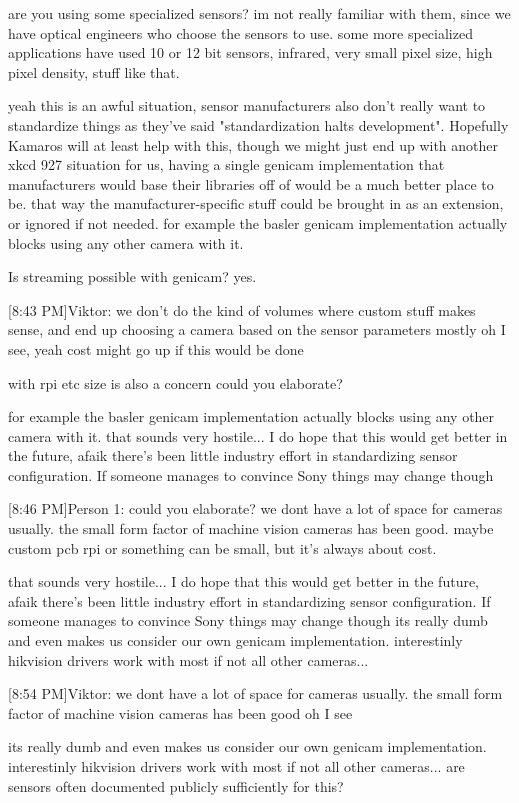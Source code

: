 are you using some specialized sensors?
im not really familiar with them, since we have optical engineers who choose the sensors to use. some more specialized applications have used 10 or 12 bit sensors, infrared, very small pixel size, high pixel density, stuff like that.

yeah this is an awful situation, sensor manufacturers also don't really want to standardize things as they've said "standardization halts development". Hopefully Kamaros will at least help with this, though we might just end up with another xkcd 927 situation
for us, having a single genicam implementation that manufacturers would base their libraries off of would be a much better place to be. that way the manufacturer-specific stuff could be brought in as an extension, or ignored if not needed.
for example the basler genicam implementation actually blocks using any other camera with it.

Is streaming possible with genicam?
yes.

[8:43 PM]Viktor:
we don't do the kind of volumes where custom stuff makes sense, and end up choosing a camera based on the sensor parameters mostly
oh I see, yeah cost might go up if this would be done

with rpi etc size is also a concern
could you elaborate?

for example the basler genicam implementation actually blocks using any other camera with it.
that sounds very hostile... I do hope that this would get better in the future, afaik there's been little industry effort in standardizing sensor configuration. If someone manages to convince Sony things may change though

[8:46 PM]Person 1:
could you elaborate?
we dont have a lot of space for cameras usually. the small form factor of machine vision cameras has been good. maybe custom pcb rpi or something can be small, but it's always about cost.

that sounds very hostile... I do hope that this would get better in the future, afaik there's been little industry effort in standardizing sensor configuration. If someone manages to convince Sony things may change though
its really dumb and even makes us consider our own genicam implementation. interestinly hikvision drivers work with most if not all other cameras...

[8:54 PM]Viktor:
we dont have a lot of space for cameras usually. the small form factor of machine vision cameras has been good
oh I see

its really dumb and even makes us consider our own genicam implementation. interestinly hikvision drivers work with most if not all other cameras...
are sensors often documented publicly sufficiently for this?

